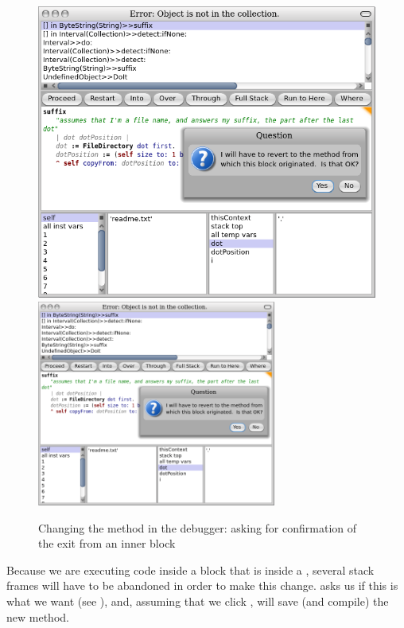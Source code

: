 \documentclass[a4paper,10pt,twoside]{book}
\begin{document}
\begin{figure}[btp]
	\begin{center}
	\ifluluelse
		{\includegraphics[width=\textwidth]{revertDialog}}
		{\includegraphics[width=0.7\textwidth]{revertDialog}}
	\end{center}
	\caption{Changing the  method in the debugger: asking for confirmation of the exit from an inner block}
\end{figure}


Because we are executing code inside a block that is inside a , several stack frames will have to be abandoned in order to make this change.  \pharo asks us if this is what we want (see ), and, assuming that we click , will save (and compile) the new method.
\end{document}
